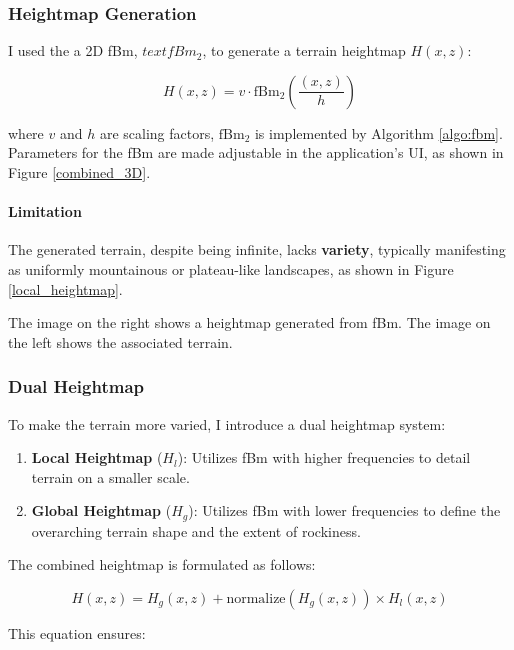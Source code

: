 \subsubsection{Heightmap Generation}

I used the a 2D fBm, $text{fBm}_{2}$, to generate a terrain heightmap $H(x,z)$:

\begin{equation}
    H(x,z) = v\cdot\text{fBm}_{2}(\frac{(x,z)}{h})
\end{equation}

where $v$ and $h$ are scaling factors, $\text{fBm}_{2}$ is implemented by Algorithm \ref{algo:fbm}. Parameters for the fBm are made adjustable in the application's UI, as shown in Figure \ref{combined_3D}.

\paragraph{Limitation}
The generated terrain, despite being infinite, lacks \textbf{variety}, typically manifesting as uniformly mountainous or plateau-like landscapes, as shown in Figure \ref{local_heightmap}.

{The image on the right shows a heightmap generated from fBm. The image on the left shows the associated terrain.}

\subsubsection{Dual Heightmap}
\label{Dual Heightmap}

To make the terrain more varied, I introduce a dual heightmap system:

\begin{enumerate}
    \item \textbf{Local Heightmap} ($H_{l}$): Utilizes fBm with higher frequencies to detail terrain on a smaller scale.
    \item \textbf{Global Heightmap} ($H_{g}$): Utilizes fBm with lower frequencies to define the overarching terrain shape and the extent of rockiness.
\end{enumerate}

The combined heightmap is formulated as follows:

\begin{equation}
H(x,z) = H_{g}(x,z) + \text{normalize}(H_{g}(x,z))\times H_{l}(x,z)
\end{equation}

This equation ensures:

